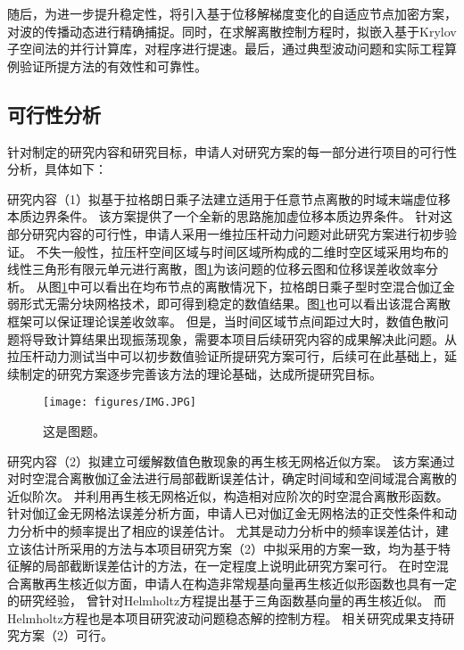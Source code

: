 随后，为进一步提升稳定性，将引入基于位移解梯度变化的自适应节点加密方案，对波的传播动态进行精确捕捉。同时，在求解离散控制方程时，拟嵌入基于Krylov子空间法的并行计算库，对程序进行提速。最后，通过典型波动问题和实际工程算例验证所提方法的有效性和可靠性。

\subsection{可行性分析}
针对制定的研究内容和研究目标，申请人对研究方案的每一部分进行项目的可行性分析，具体如下：

研究内容（1）拟基于拉格朗日乘子法建立适用于任意节点离散的时域末端虚位移本质边界条件。
该方案提供了一个全新的思路施加虚位移本质边界条件。
针对这部分研究内容的可行性，申请人采用一维拉压杆动力问题对此研究方案进行初步验证。
不失一般性，拉压杆空间区域与时间区域所构成的二维时空区域采用均布的线性三角形有限元单元进行离散，图\ref{fg:bar}为该问题的位移云图和位移误差收敛率分析。
从图\ref{fg:bar}中可以看出在均布节点的离散情况下，拉格朗日乘子型时空混合伽辽金弱形式无需分块网格技术，即可得到稳定的数值结果。图\ref{fg:bar}也可以看出该混合离散框架可以保证理论误差收敛率。
但是，当时间区域节点间距过大时，数值色散问题将导致计算结果出现振荡现象，需要本项目后续研究内容的成果解决此问题。从拉压杆动力测试当中可以初步数值验证所提研究方案可行，后续可在此基础上，延续制定的研究方案逐步完善该方法的理论基础，达成所提研究目标。

\begin{figure}[!h]
    \centering %
    \texttt{[image: figures/IMG.JPG]}
    \captionsetup{justification=centering} %
    \caption{这是图题。}\label{fg:bar}
\end{figure}

研究内容（2）拟建立可缓解数值色散现象的再生核无网格近似方案。
该方案通过对时空混合离散伽辽金法进行局部截断误差估计，确定时间域和空间域混合离散的近似阶次。
并利用再生核无网格近似，构造相对应阶次的时空混合离散形函数。
针对伽辽金无网格法误差分析方面，申请人已对伽辽金无网格法的正交性条件和动力分析中的频率提出了相应的误差估计。
尤其是动力分析中的频率误差估计，建立该估计所采用的方法与本项目研究方案（2）中拟采用的方案一致，均为基于特征解的局部截断误差估计的方法，在一定程度上说明此研究方案可行。
在时空混合离散再生核近似方面，申请人在构造非常规基向量再生核近似形函数也具有一定的研究经验，
曾针对Helmholtz方程提出基于三角函数基向量的再生核近似。
而Helmholtz方程也是本项目研究波动问题稳态解的控制方程。
相关研究成果支持研究方案（2）可行。

